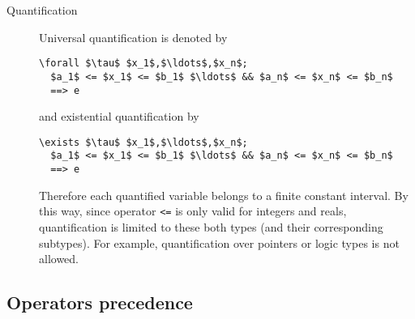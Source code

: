 \begin{description}
\item[Quantification] Universal quantification is denoted by
\begin{lstlisting}
\forall $\tau$ $x_1$,$\ldots$,$x_n$;
  $a_1$ <= $x_1$ <= $b_1$ $\ldots$ && $a_n$ <= $x_n$ <= $b_n$
  ==> e
\end{lstlisting} and existential quantification by
\begin{lstlisting}
\exists $\tau$ $x_1$,$\ldots$,$x_n$;
  $a_1$ <= $x_1$ <= $b_1$ $\ldots$ && $a_n$ <= $x_n$ <= $b_n$
  ==> e
\end{lstlisting}
Therefore each quantified variable belongs to a finite constant interval. By
this way, since operator \lstinline|<=| is only valid for integers and reals,
quantification is limited to these both types (and their corresponding
subtypes). For example, quantification over \C pointers or logic types is not
allowed.
\end{description}


\subsection{Operators precedence}

\nodiff

